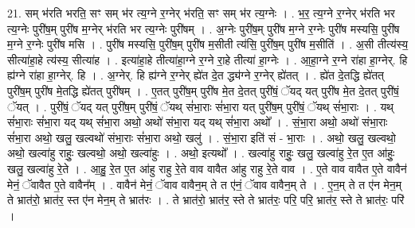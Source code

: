 \documentclass[17pt]{extarticle}
\begin{document}
21. सम् भ॑रति भरति॒ सꣳ सम् भ॑र त्य॒ग्ने र॒ग्नेर् भ॑रति॒ सꣳ सम् भ॑र त्य॒ग्नेः । . भ॒र॒ त्य॒ग्ने र॒ग्नेर् भ॑रति भर त्य॒ग्नेः पुरी॑ष॒म् पुरी॑ष म॒ग्नेर् भ॑रति भर त्य॒ग्नेः पुरी॑षम् । . अ॒ग्नेः पुरी॑ष॒म् पुरी॑ष म॒ग्ने र॒ग्नेः पुरी॑ष मस्यसि॒ पुरी॑ष म॒ग्ने र॒ग्नेः पुरी॑ष मसि । . पुरी॑ष मस्यसि॒ पुरी॑ष॒म् पुरी॑ष म॒सीती त्य॑सि॒ पुरी॑ष॒म् पुरी॑ष म॒सीति॑ । . अ॒सी तीत्य॑स्य॒ सीत्या॑हा॒हे त्य॑स्य॒ सीत्या॑ह । . इत्या॑हा॒हे तीत्या॑हा॒ग्ने र॒ग्ने रा॒हे तीत्या॑ हा॒ग्नेः । . आ॒हा॒ग्ने र॒ग्ने रा॑हा हा॒ग्नेर्. हि ह्य॑ग्ने रा॑हा हा॒ग्नेर्. हि । . अ॒ग्नेर्. हि ह्य॑ग्ने र॒ग्नेर् ह्ये॑त दे॒त द्ध्य॑ग्ने र॒ग्नेर् ह्ये॑तत् । . ह्ये॑त दे॒तद्धि ह्ये॑तत् पुरी॑ष॒म् पुरी॑ष मे॒तद्धि ह्ये॑तत् पुरी॑षम् । . ए॒तत् पुरी॑ष॒म् पुरी॑ष मे॒त दे॒तत् पुरी॑षं॒ ॅयद् यत् पुरी॑ष मे॒त दे॒तत् पुरी॑षं॒ ॅयत् । . पुरी॑षं॒ ॅयद् यत् पुरी॑ष॒म् पुरी॑षं॒ ॅयथ् सं॑भा॒राः सं॑भा॒रा यत् पुरी॑ष॒म् पुरी॑षं॒ ॅयथ् सं॑भा॒राः । . यथ् सं॑भा॒राः सं॑भा॒रा यद् यथ् सं॑भा॒रा अथो॒ अथो॑ संभा॒रा यद् यथ् सं॑भा॒रा अथो᳚ । . सं॒भा॒रा अथो॒ अथो॑ संभा॒राः सं॑भा॒रा अथो॒ खलु॒ खल्वथो॑ संभा॒राः सं॑भा॒रा अथो॒ खलु॑ । . सं॒भा॒रा इति॑ सं - भा॒राः । . अथो॒ खलु॒ खल्वथो॒ अथो॒ खल्वा॑हु राहुः॒ खल्वथो॒ अथो॒ खल्वा॑हुः । . अथो॒ इत्यथो᳚ । . खल्वा॑हु राहुः॒ खलु॒ खल्वा॑हु रे॒त ए॒त आ॑हुः॒ खलु॒ खल्वा॑हु रे॒ते । . आ॒हु॒ रे॒त ए॒त आ॑हु राहु रे॒ते वाव वावैत आ॑हु राहु रे॒ते वाव । . ए॒ते वाव वावैत ए॒ते वावैन॑ मेनं॒ ॅवावैत ए॒ते वावैन᳚म् । . वावैन॑ मेनं॒ ॅवाव वावैन॒म् ते त ए॑नं॒ ॅवाव वावैन॒म् ते । . ए॒न॒म् ते त ए॑न मेन॒म् ते भ्रात॑रो॒ भ्रात॑र॒ स्त ए॑न मेन॒म् ते भ्रात॑रः । . ते भ्रात॑रो॒ भ्रात॑र॒ स्ते ते भ्रात॑रः॒ परि॒ परि॒ भ्रात॑र॒ स्ते ते भ्रात॑रः॒ परि॑ । \newline
\end{document}
